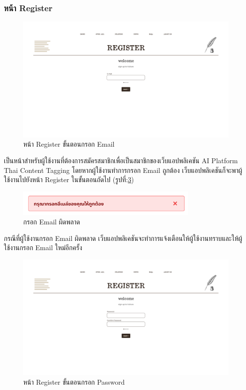 \documentclass[12pt,oneside,openright,a4paper]{cpe-thai-project}
\begin{document}
\subsubsection{หน้า Register}
\begin{figure}[!ht]\centering
  \includegraphics[width=16cm]{./img/project_ui/4.png} 
  \caption{หน้า Register ขั้นตอนกรอก Email}\label{fig:register} 
\end{figure}
\hspace*{1cm}เป็นหน้าสำหรับผู้ใช้งานที่ต้องการสมัครสมาชิกเพื่อเป็นสมาชิกของเว็บแอปพลิเคชัน AI Platform Thai Content Tagging 
โดยหากผู้ใช้งานทำการกรอก Email ถูกต้อง เว็บแอปพลิเคชันก็จะพาผู้ใช้งานไปยังหน้า Register ในขั้นตอนถัดไป (รูปที่:\ref{fig:register_password})
\begin{figure}[!ht]\centering
  \includegraphics[width=9cm]{./img/project_ui/wrong_email.png} 
  \caption{กรอก Email ผิดพลาด}\label{fig:wrong_email} 
\end{figure}
\newline\hspace*{1cm}กรณีที่ผู้ใช้งานกรอก Email ผิดพลาด เว็บแอปพลิเคชันจะทำการแจ้งเตือนให้ผู้ใช้งานทราบและให้ผู้ใช้งานกรอก Email ใหม่อีกครั้ง \newpage
\begin{figure}[!ht]\centering
  \includegraphics[width=14cm]{./img/project_ui/5.png} 
  \caption{หน้า Register ขั้นตอนกรอก Password}\label{fig:register_password} 
\end{figure}
\end{document}

